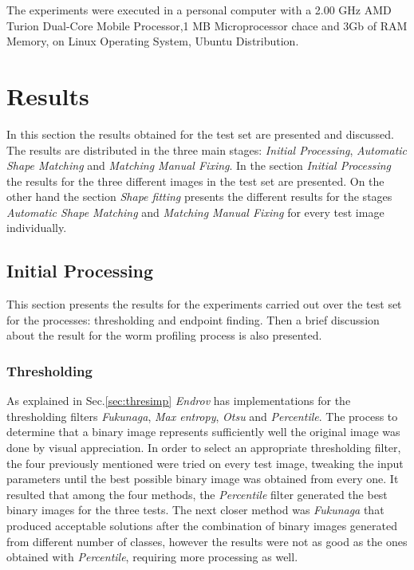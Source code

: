 The experiments were executed in a personal computer with a 2.00 GHz AMD Turion 
Dual-Core Mobile Processor,1 MB Microprocessor chace and 3Gb of RAM Memory, 
on Linux Operating System, Ubuntu Distribution.

\section{Results}
\label{sec:results}

In this section the results obtained for the test set are presented and discussed. The results are distributed in the three main stages: \emph{Initial Processing}, \emph{Automatic Shape Matching} and
\emph{Matching Manual Fixing}. In the section \emph{Initial Processing} the results for the three different 
images in the test set are presented. On the other hand the section \emph{Shape fitting} presents the different
results for the stages \emph{Automatic Shape Matching} and \emph{Matching Manual Fixing} for every test image
individually.

\subsection{Initial Processing}
\label{sec:initproc}

This section presents the results for the experiments carried out over the test set for the 
processes: thresholding and endpoint finding. Then a brief discussion about
the result for the worm profiling process is also presented.

\subsubsection*{Thresholding}

As explained in Sec.\ref{sec:thresimp} \emph{Endrov} has implementations for the 
thresholding filters \emph{Fukunaga}, \emph{Max entropy}, \emph{Otsu} and \emph{Percentile}.
The process to determine that a binary image represents sufficiently well the original 
image was done by visual appreciation. In order to select an appropriate thresholding
filter, the four previously mentioned were tried on every test image, tweaking the
input parameters until the best possible binary image was obtained from every one.
It resulted that among the four methods, the \emph{Percentile} filter generated the
best binary images for the three tests. The next closer method was \emph{Fukunaga}
that produced acceptable solutions after the combination of binary images
generated from different number of classes, however the results were not as good as
the ones obtained with \emph{Percentile}, requiring more processing as well.\\

